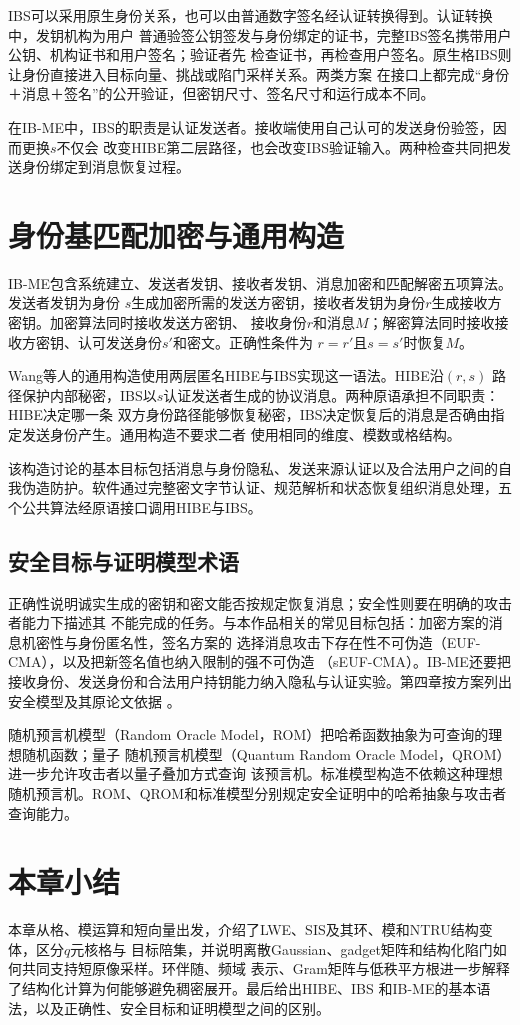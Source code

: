 IBS可以采用原生身份关系，也可以由普通数字签名经认证转换得到。认证转换中，发钥机构为用户
普通验签公钥签发与身份绑定的证书，完整IBS签名携带用户公钥、机构证书和用户签名；验证者先
检查证书，再检查用户签名。原生格IBS则让身份直接进入目标向量、挑战或陷门采样关系。两类方案
在接口上都完成“身份＋消息＋签名”的公开验证，但密钥尺寸、签名尺寸和运行成本不同。

在IB-ME中，IBS的职责是认证发送者。接收端使用自己认可的发送身份验签，因而更换$s$不仅会
改变HIBE第二层路径，也会改变IBS验证输入。两种检查共同把发送身份绑定到消息恢复过程。

\section{身份基匹配加密与通用构造}

IB-ME包含系统建立、发送者发钥、接收者发钥、消息加密和匹配解密五项算法。发送者发钥为身份
$s$生成加密所需的发送方密钥，接收者发钥为身份$r$生成接收方密钥。加密算法同时接收发送方密钥、
接收身份$r$和消息$M$；解密算法同时接收接收方密钥、认可发送身份$s'$和密文。正确性条件为
$r=r'$且$s=s'$时恢复$M$。

Wang等人的通用构造使用两层匿名HIBE与IBS实现这一语法\cite{wang2024ibme}。HIBE沿$(r,s)$
路径保护内部秘密，IBS以$s$认证发送者生成的协议消息。两种原语承担不同职责：HIBE决定哪一条
双方身份路径能够恢复秘密，IBS决定恢复后的消息是否确由指定发送身份产生。通用构造不要求二者
使用相同的维度、模数或格结构。

该构造讨论的基本目标包括消息与身份隐私、发送来源认证以及合法用户之间的自我伪造防护。软件通过完整密文字节认证、规范解析和状态恢复组织消息处理，五个公共算法经原语接口调用HIBE与IBS。

\subsection{安全目标与证明模型术语}

正确性说明诚实生成的密钥和密文能否按规定恢复消息；安全性则要在明确的攻击者能力下描述其
不能完成的任务。与本作品相关的常见目标包括：加密方案的消息机密性与身份匿名性，签名方案的
选择消息攻击下存在性不可伪造（EUF-CMA），以及把新签名值也纳入限制的强不可伪造
（sEUF-CMA）。IB-ME还要把接收身份、发送身份和合法用户持钥能力纳入隐私与认证实验。第四章按方案列出安全模型及其原论文依据
\cite{wang2024ibme,sageloli2023ibs}。

随机预言机模型（Random Oracle Model，ROM）把哈希函数抽象为可查询的理想随机函数；量子
随机预言机模型（Quantum Random Oracle Model，QROM）进一步允许攻击者以量子叠加方式查询
该预言机。标准模型构造不依赖这种理想随机预言机。ROM、QROM和标准模型分别规定安全证明中的哈希抽象与攻击者查询能力。

\section{本章小结}

本章从格、模运算和短向量出发，介绍了LWE、SIS及其环、模和NTRU结构变体，区分$q$元核格与
目标陪集，并说明离散Gaussian、gadget矩阵和结构化陷门如何共同支持短原像采样。环伴随、频域
表示、Gram矩阵与低秩平方根进一步解释了结构化计算为何能够避免稠密展开。最后给出HIBE、IBS
和IB-ME的基本语法，以及正确性、安全目标和证明模型之间的区别。
